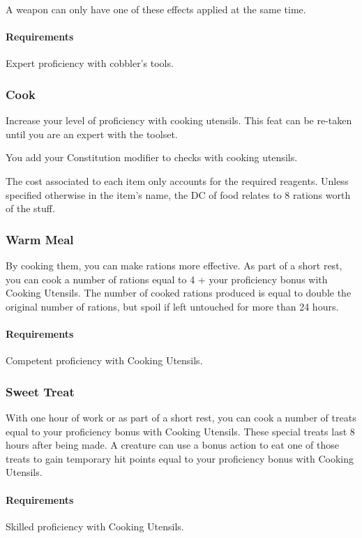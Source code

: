     A weapon can only have one of these effects applied at the same time.
    \paragraph{Requirements} Expert proficiency with cobbler's tools.

\subsubsection{Cook} \label{feat::cook}
    Increase your level of proficiency with cooking utensils.
    This feat can be re-taken until you are an expert with the toolset.

    You add your Constitution modifier to checks with cooking utensils.

    The cost associated to each item only accounts for the required reagents.
    Unless specified otherwise in the item's name, the DC of food relates to 8 rations worth of the stuff.
\subsubsection{Warm Meal} \label{feat::warmmeal}
    By cooking them, you can make rations more effective.
    As part of a short rest, you can cook a number of rations equal to 4 + your proficiency bonus with Cooking Utensils.
    The number of cooked rations produced is equal to double the original number of rations, but spoil if left untouched for more than 24 hours.
    \paragraph{Requirements} Competent proficiency with Cooking Utensils.
\subsubsection{Sweet Treat} \label{feat::sweettreat}
    With one hour of work or as part of a short rest, you can cook a number of treats equal to your proficiency bonus with Cooking Utensils.
    These special treats last 8 hours after being made.
    A creature can use a bonus action to eat one of those treats to gain temporary hit points equal to your proficiency bonus with Cooking Utensils.
    \paragraph{Requirements} Skilled proficiency with Cooking Utensils.
